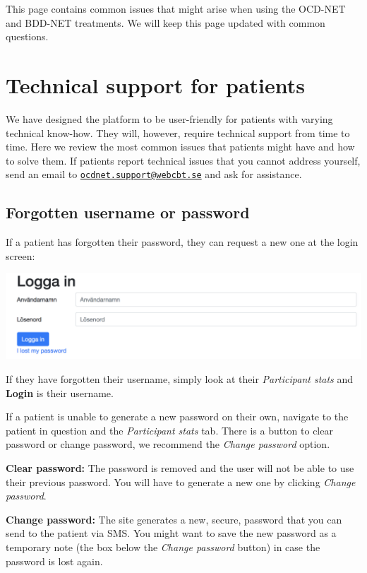 \documentclass[]{book}
\theoremstyle{definition}
\theoremstyle{definition}
\theoremstyle{definition}
\theoremstyle{remark}
\begin{document}
This page contains common issues that might arise when using the OCD-NET
and BDD-NET treatments. We will keep this page updated with common
questions.

\hypertarget{technical-support-for-patients}{%
\section{Technical support for
patients}\label{technical-support-for-patients}}

We have designed the platform to be user-friendly for patients with
varying technical know-how. They will, however, require technical
support from time to time. Here we review the most common issues that
patients might have and how to solve them. If patients report technical
issues that you cannot address yourself, send an email to
\href{mailto:ocdnet.support@webcbt.se}{\nolinkurl{ocdnet.support@webcbt.se}}
and ask for assistance.

\hypertarget{forgotten-username-or-password}{%
\subsection{Forgotten username or
password}\label{forgotten-username-or-password}}

If a patient has forgotten their password, they can request a new one at
the login screen:

\includegraphics{images/patient-lost-password.png}

If they have forgotten their username, simply look at their
\emph{Participant stats} and \textbf{Login} is their username.

If a patient is unable to generate a new password on their own, navigate
to the patient in question and the \emph{Participant stats} tab. There
is a button to clear password or change password, we recommend the
\emph{Change password} option.

\textbf{Clear password:} The password is removed and the user will not
be able to use their previous password. You will have to generate a new
one by clicking \emph{Change password}.

\textbf{Change password:} The site generates a new, secure, password
that you can send to the patient via SMS. You might want to save the new
password as a temporary note (the box below the \emph{Change password}
button) in case the password is lost again.
\end{document}
